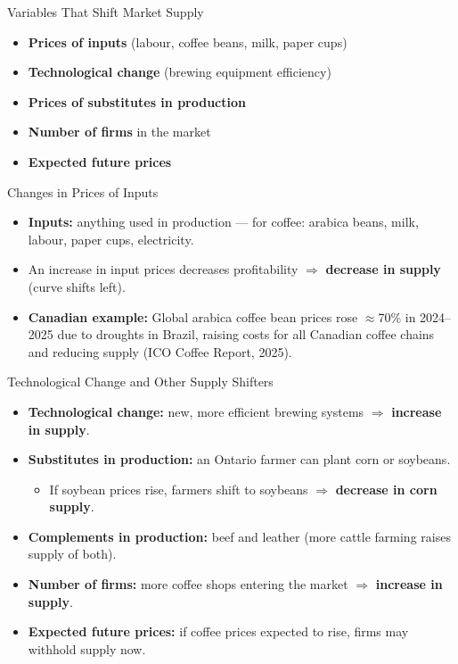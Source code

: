 \documentclass[aspectratio=169]{beamer}
\begin{document}
\begin{frame}{Variables That Shift Market Supply}
\transfade
\begin{itemize}[<+->]
  \item \textbf{Prices of inputs} (labour, coffee beans, milk, paper cups)
  \item \textbf{Technological change} (brewing equipment efficiency)
  \item \textbf{Prices of substitutes in production}
  \item \textbf{Number of firms} in the market
  \item \textbf{Expected future prices}
\end{itemize}
\end{frame}

\begin{frame}{Changes in Prices of Inputs}
\transfade
\begin{itemize}[<+->]
  \item \textbf{Inputs:} anything used in production --- for coffee: arabica beans, milk, labour, paper cups, electricity.
  \item An \alert{increase} in input prices decreases profitability $\Rightarrow$ \textbf{decrease in supply} (curve shifts left).
  \item \textbf{Canadian example:} Global arabica coffee bean prices rose $\approx$70\% in 2024--2025 due to droughts in Brazil, raising costs for all Canadian coffee chains and reducing supply (ICO Coffee Report, 2025).
\end{itemize}
\end{frame}

\begin{frame}{Technological Change and Other Supply Shifters}
\transfade
\begin{itemize}[<+->]
  \item \textbf{Technological change:} new, more efficient brewing systems $\Rightarrow$ \textbf{increase in supply}.
  \item \textbf{Substitutes in production:} an Ontario farmer can plant corn or soybeans.
  \begin{itemize}[<+->]
    \item If soybean prices rise, farmers shift to soybeans $\Rightarrow$ \textbf{decrease in corn supply}.
  \end{itemize}
  \item \textbf{Complements in production:} beef and leather (more cattle farming raises supply of both).
  \item \textbf{Number of firms:} more coffee shops entering the market $\Rightarrow$ \textbf{increase in supply}.
  \item \textbf{Expected future prices:} if coffee prices expected to rise, firms may withhold supply now.
\end{itemize}
\end{frame}
\end{document}
